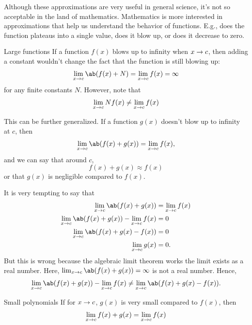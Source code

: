 Although these approximations are very useful in general science, it's not so acceptable in the land of mathematics. Mathematics is more interested in approximations that help us understand the behavior of functions. E.g., does the function plateaus into a single value, does it blow up, or does it decrease to zero.

\begin{exmp}{Large functions}{}
  If a function \(f(x)\) blows up to infinity when \(x \rightarrow c\), then adding a constant wouldn't change the fact that the function is still blowing up:
  \begin{equation}
    \lim_{x \appr c} \ab(f(x) + N) = \lim_{x \appr c} f(x) = \infty
  \end{equation}
  for any finite constants \(N\). However, note that
  \begin{equation}
    \lim_{x \rightarrow c} Nf(x) \neq \lim_{x \rightarrow c} f(x)
  \end{equation}

  This can be further generalized. If a function \(g(x)\) doesn't blow up to infinity at \(c\), then
  \begin{equation}
    \lim_{x \appr c} \ab(f(x) + g(x)) = \lim_{x \appr c} f(x),
  \end{equation}
  and we can say that around \(c\),
  \begin{equation}
    f(x) + g(x) \approx f(x)
  \end{equation}
  or that \(g(x)\) is negligible compared to \(f(x)\).
\end{exmp}

It is very tempting to say that
\begin{align}
  \lim_{x \appr c} \ab(f(x) + g(x))                         & = \lim_{x \appr c} f(x) \\
  \lim_{x \appr c} \ab(f(x) + g(x)) - \lim_{x \appr c} f(x) & = 0                     \\
  \lim_{x \appr c} \ab(f(x) + g(x) - f(x))                  & = 0                     \\
  \lim_{x \appr c} g(x)                                     & = 0.
\end{align}
But this is wrong because the algebraic limit theorem works \ifft the limit exists as a real number. Here, \(\lim_{x \appr c} \ab(f(x) + g(x)) = \infty\) is not a real number. Hence,
\begin{equation}
  \lim_{x \appr c} \ab(f(x) + g(x)) - \lim_{x \appr c} f(x) \neq \lim_{x \appr c} \ab(f(x) + g(x) - f(x)).
\end{equation}

\begin{exmp}{Small polynomials}{}
  If for \(x \rightarrow c\), \(g(x)\) is very small compared to \(f(x)\), then
  \begin{equation}
    \lim_{x \rightarrow c} f(x) + g(x) = \lim_{x \rightarrow c} f(x)
  \end{equation}
\end{exmp}

